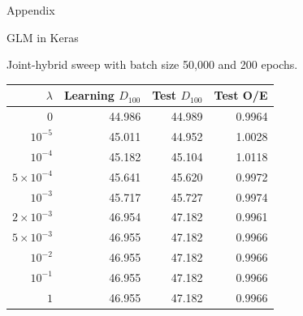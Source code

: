 \documentclass[aspectratio=169]{beamer}
\begin{document}
\appendix
\begin{frame}
    \centering
    \LARGE Appendix
\end{frame}

\begin{frame}{GLM in Keras}
    \centering
    \resizebox{0.72\textwidth}{!}{}
\end{frame}

\begin{frame}{Joint-hybrid sweep with batch size 50,000 and 200 epochs.}
    \centering
    \small
\begin{tabular}{rrrr}
\hline
$\lambda$ & Learning $D_{100}$ & Test $D_{100}$ & Test O/E\\
\hline
$0$ & 44.986 & 44.989 & 0.9964\\
$10^{-5}$ & 45.011 & 44.952 & 1.0028\\
$10^{-4}$ & 45.182 & 45.104 & 1.0118\\
$5\times10^{-4}$ & 45.641 & 45.620 & 0.9972\\
$10^{-3}$ & 45.717 & 45.727 & 0.9974\\
$2\times10^{-3}$ & 46.954 & 47.182 & 0.9961\\
$5\times10^{-3}$ & 46.955 & 47.182 & 0.9966\\
$10^{-2}$ & 46.955 & 47.182 & 0.9966\\
$10^{-1}$ & 46.955 & 47.182 & 0.9966\\
$1$ & 46.955 & 47.182 & 0.9966\\
\hline
\end{tabular}
\end{frame}
\end{document}
